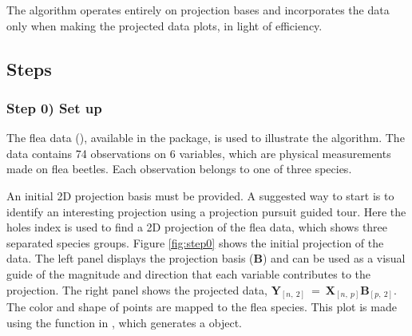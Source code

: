 The algorithm operates entirely on projection bases and incorporates the
data only when making the projected data plots, in light of efficiency.

\hypertarget{steps}{%
\subsection{Steps}\label{steps}}

\hypertarget{step-0-set-up}{%
\subsubsection{Step 0) Set up}\label{step-0-set-up}}

The flea data (\citet{lubischew_use_1962}), available in the 
package, is used to illustrate the algorithm. The data contains 74
observations on 6 variables, which are physical measurements made on
flea beetles. Each observation belongs to one of three species.

An initial 2D projection basis must be provided. A suggested way to
start is to identify an interesting projection using a projection
pursuit guided tour. Here the holes index is used to find a 2D
projection of the flea data, which shows three separated species groups.
Figure \ref{fig:step0} shows the initial projection of the data. The
left panel displays the projection basis (\(\textbf{B}\)) and can be
used as a visual guide of the magnitude and direction that each variable
contributes to the projection. The right panel shows the projected data,
\(\textbf{Y}_{[n,~2]} ~=~ \textbf{X}_{[n,~p]} \textbf{B}_{[p,~2]}\). The
color and shape of points are mapped to the flea species. This plot is
made using the  function in , which
generates a  \citep{wickham_ggplot2_2016} object.


